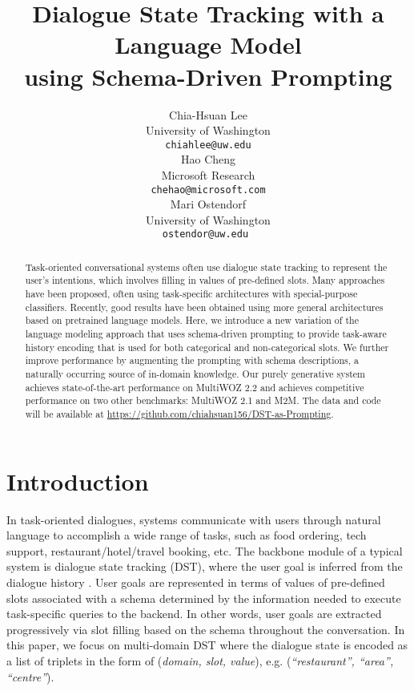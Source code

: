 \documentclass[11pt]{article}
\title{Dialogue State Tracking with a Language Model\\ using Schema-Driven Prompting}
\author{Chia-Hsuan Lee \\
 University of Washington\\
   \texttt{chiahlee@uw.edu} \\\And
   Hao Cheng \\
   Microsoft Research \\
   \texttt{chehao@microsoft.com}\\\And
   Mari Ostendorf\\
   University of Washington\\
   \texttt{ostendor@uw.edu
}}
\begin{document}
\maketitle
\begin{abstract}
Task-oriented conversational systems often use dialogue state tracking to represent the user's intentions, which involves filling in values of pre-defined slots. Many approaches have been proposed, often using task-specific architectures with special-purpose classifiers.  Recently, good results have been obtained using more general architectures based on pretrained language models.
Here, we introduce a new variation of the language modeling approach that uses schema-driven prompting to provide task-aware history encoding that is used for both categorical and non-categorical slots. 
We further improve performance by augmenting the prompting with schema descriptions, a naturally occurring source of in-domain knowledge.
Our purely generative system achieves state-of-the-art performance on MultiWOZ 2.2 and achieves competitive performance on two other benchmarks: MultiWOZ 2.1 and M2M. The data and code will be available at \url{https://github.com/chiahsuan156/DST-as-Prompting}.
\end{abstract}



\section{Introduction}

In task-oriented dialogues, systems communicate with users through natural language to accomplish a wide range of tasks, such as food ordering, tech support, restaurant/hotel/travel booking, etc.
The backbone module of a typical 
system is dialogue state tracking (DST), where the user goal is inferred from the dialogue history \cite{henderson2014second,shah2018building,budzianowski2018multiwoz}.
User goals are represented in terms of values of pre-defined slots associated with a schema determined by the information needed to execute task-specific queries to the backend.
In other words, user goals are extracted progressively via slot filling based on the schema throughout the conversation.
In this paper, we focus on multi-domain DST where the dialogue state is encoded as a list of triplets in the form of (\textit{domain, slot, value}), e.g. (\textit{``restaurant'', ``area'', ``centre''}). 
\end{document}
